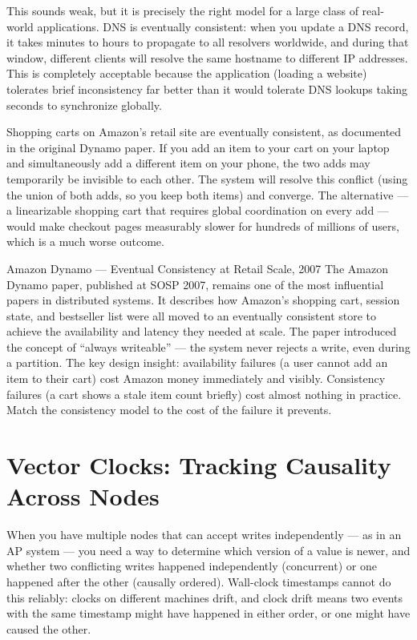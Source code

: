 \documentclass[11pt,a4paper]{article}
\begin{document}
This sounds weak, but it is precisely the right model for a large class of real-world applications. DNS is eventually consistent: when you update a DNS record, it takes minutes to hours to propagate to all resolvers worldwide, and during that window, different clients will resolve the same hostname to different IP addresses. This is completely acceptable because the application (loading a website) tolerates brief inconsistency far better than it would tolerate DNS lookups taking seconds to synchronize globally.

Shopping carts on Amazon's retail site are eventually consistent, as documented in the original Dynamo paper. If you add an item to your cart on your laptop and simultaneously add a different item on your phone, the two adds may temporarily be invisible to each other. The system will resolve this conflict (using the union of both adds, so you keep both items) and converge. The alternative --- a linearizable shopping cart that requires global coordination on every add --- would make checkout pages measurably slower for hundreds of millions of users, which is a much worse outcome.

\begin{industrybox}{Amazon Dynamo --- Eventual Consistency at Retail Scale, 2007}
The Amazon Dynamo paper, published at SOSP 2007, remains one of the most influential papers in distributed systems. It describes how Amazon's shopping cart, session state, and bestseller list were all moved to an eventually consistent store to achieve the availability and latency they needed at scale. The paper introduced the concept of ``always writeable'' --- the system never rejects a write, even during a partition. The key design insight: availability failures (a user cannot add an item to their cart) cost Amazon money immediately and visibly. Consistency failures (a cart shows a stale item count briefly) cost almost nothing in practice. Match the consistency model to the cost of the failure it prevents.
\end{industrybox}

\section{Vector Clocks: Tracking Causality Across Nodes}
\label{sec:vector-clocks}

When you have multiple nodes that can accept writes independently --- as in an AP system --- you need a way to determine which version of a value is newer, and whether two conflicting writes happened independently (concurrent) or one happened after the other (causally ordered). Wall-clock timestamps cannot do this reliably: clocks on different machines drift, and clock drift means two events with the same timestamp might have happened in either order, or one might have caused the other.
\end{document}
